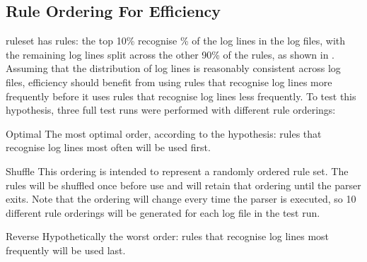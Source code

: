 

\FloatBarrier{}

\subsection{Rule Ordering For Efficiency}

\label{rule ordering for efficiency}

\parsernames{} ruleset has \numberOFrules{} rules: the top 10\% recognise
\% of the log lines in the
\numberOFlogFILES{} log files, with the remaining log lines split across
the other 90\% of the rules, as shown in .
Assuming that the distribution of log lines is reasonably consistent across
log files, \parsernames{} efficiency should benefit from using rules that
recognise log lines more frequently before it uses rules that recognise log
lines less frequently.  To test this hypothesis, three full test runs were
performed with different rule orderings:

\begin{boldeqlist}

    \item [Optimal]  The most optimal order, according to the hypothesis:
        rules that recognise log lines most often will be used first.

    \item [Shuffle] This ordering is intended to represent a randomly
        ordered rule set.  The rules will be shuffled once before use and
        will retain that ordering until the parser exits.  Note that the
        ordering will change every time the parser is executed, so 10
        different rule orderings will be generated for each log file in the
        test run.

    \item [Reverse] Hypothetically the worst order: rules that recognise
        log lines most frequently will be used last.

\end{boldeqlist}

